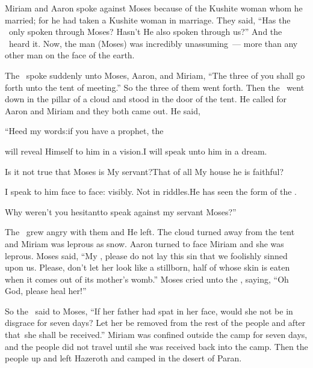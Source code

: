 
\begin{inparaenum}
   Miriam and Aaron spoke against Moses because of the Kushite woman whom he married; for he had taken a Kushite woman in marriage.%
   They said, ``Has the \lord\ only spoken through Moses? Hasn't He also spoken through us?'' And the \lord\ heard it.%
   Now, the man (Moses) was incredibly unassuming~--- more than any other man on the face of the earth.%

   The \lord\ spoke suddenly unto Moses, Aaron, and Miriam, ``The three of you shall go forth unto the tent of meeting.'' So the three of them went forth.%
   Then the \lord\ went down in the pillar of a cloud and stood in the door of the tent. He called for Aaron and Miriam and they both came out.%
   He said,\smallskip%

  \pb{}``Heed my words:\pa{}if you have a prophet, the \lord%

  \pb{}will reveal Himself to him in a vision.\pa{}I will speak unto him in a dream.%

  \pa{} Is it not true that Moses is My servant?\pa{}That of all My house he is faithful?%

  \pa{} I speak to him face to face: visibly. Not in riddles.\pa{}He has seen the form of the \lord.%

  \pb{}Why weren't you hesitant\pa{}to speak against my servant Moses?''\smallskip%

  \noindent{} The \lord\ grew angry with them and He left.%
   The cloud turned away from the tent and Miriam was leprous as snow. Aaron turned to face Miriam and she was leprous.%
   Moses said, ``My \lord, please do not lay this sin that we foolishly sinned upon us.%
   Please, don't let her look like a stillborn, half of whose skin is eaten when it comes out of its mother's womb.''%
   Moses cried unto the \lord, saying, ``Oh God, please heal her!''%

   So the \lord\ said to Moses, ``If her father had spat in her face, would she not be in disgrace for seven days? Let her be removed from the rest of the people and after that\understood{}\ she shall be received.''%
   Miriam was confined outside the camp for seven days, and the people did not travel until she was received back into the camp.%
   Then the people up and left Hazeroth and camped in the desert of Paran.%
\end{inparaenum}
